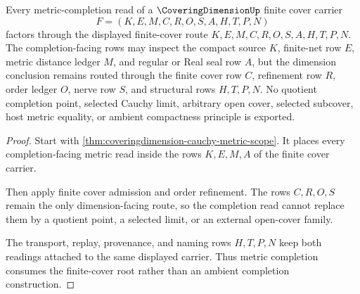 \begin{theorem}
\label{thm:coveringdimension-finite-cover-root-metric-completion-route}
Every metric-completion read of a $\CoveringDimensionUp$ finite cover carrier
$$
F=(K,E,M,C,R,O,S,A,H,T,P,N)
$$
factors through the displayed finite-cover route $K,E,M,C,R,O,S,A,H,T,P,N$. The completion-facing rows may inspect the compact source $K$, finite-net row $E$, metric distance ledger $M$, and regular or Real seal row $A$, but the dimension conclusion remains routed through the finite cover row $C$, refinement row $R$, order ledger $O$, nerve row $S$, and structural rows $H,T,P,N$. No quotient completion point, selected Cauchy limit, arbitrary open cover, selected subcover, host metric equality, or ambient compactness principle is exported.
\end{theorem}
\begin{proof}
Start with \autoref{thm:coveringdimension-cauchy-metric-scope}. It places every completion-facing metric read inside the rows $K,E,M,A$ of the finite cover carrier.

Then apply finite cover admission and order refinement. The rows $C,R,O,S$ remain the only dimension-facing route, so the completion read cannot replace them by a quotient point, a selected limit, or an external open-cover family.

The transport, replay, provenance, and naming rows $H,T,P,N$ keep both readings attached to the same displayed carrier. Thus metric completion consumes the finite-cover root rather than an ambient completion construction.
\end{proof}

